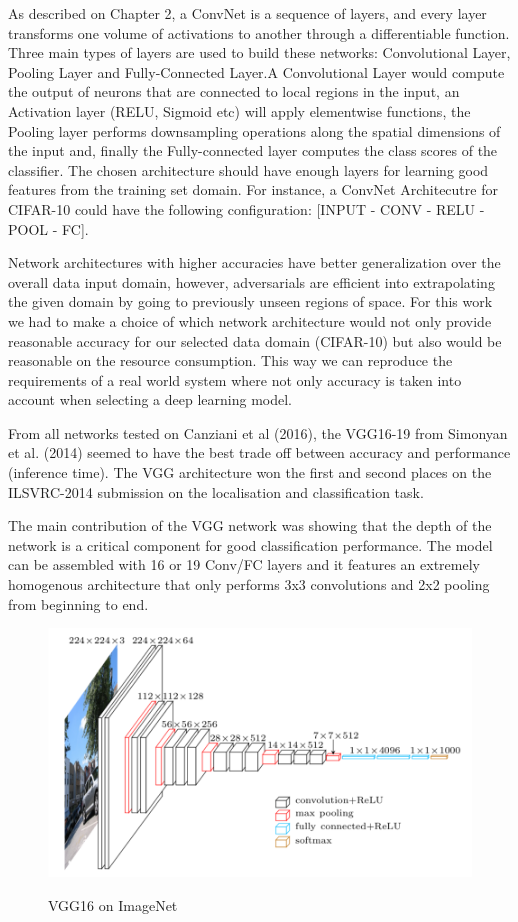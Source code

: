 As described on Chapter 2, a ConvNet is a sequence of layers, and every layer transforms one volume of activations to another through a differentiable function. Three main types of layers are used to build these networks: Convolutional Layer, Pooling Layer and Fully-Connected Layer.A Convolutional Layer would compute the output of neurons that are connected to local regions in the input, an Activation layer (RELU, Sigmoid etc) will apply elementwise functions, the Pooling layer performs downsampling operations along the spatial dimensions of the input and, finally the Fully-connected layer computes the class scores of the classifier. The chosen architecture should have enough layers for learning good features from the training set domain. For instance, a ConvNet Architecutre for CIFAR-10 could have the following configuration: [INPUT - CONV - RELU - POOL - FC].

Network architectures with higher accuracies have better generalization over the overall data input domain, however, adversarials are efficient into extrapolating the given domain by going to previously unseen regions of space. For this work we had to make a choice of which network architecture would not only provide reasonable accuracy for our selected data domain (CIFAR-10) but also would be reasonable on the resource consumption. This way we can reproduce the requirements of a real world system where not only accuracy is taken into account when selecting a deep learning model.

From all networks tested on Canziani et al (2016), the VGG16-19 from Simonyan et al. (2014)  seemed to have the best trade off between accuracy and performance (inference time). The VGG architecture won the first and second places on the ILSVRC-2014 submission on the localisation and classification task.

The main contribution of the VGG network was showing that the depth of the network is a critical component for good classification performance. The model can be assembled with 16 or 19 Conv/FC layers and it features an extremely homogenous architecture that only performs 3x3 convolutions and 2x2 pooling from beginning to end.

\begin{figure}[!h]
	\centering
	\includegraphics[scale=0.6]{imagenet_vgg16.png}
	\caption{VGG16 on ImageNet}
	\cite{simonyan2014very}
	\label{fig:vgg16}
\end{figure}

